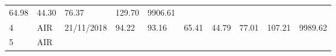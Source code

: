 \documentclass[
  11pt,
]{article}
\begin{document}
\begin{longtable}[]{@{}llllllllll@{}}
\begin{minipage}[t]{0.06\columnwidth}
64.98\strut
\end{minipage} & \begin{minipage}[t]{0.06\columnwidth}\raggedright
44.30\strut
\end{minipage} & \begin{minipage}[t]{0.06\columnwidth}\raggedright
76.37\strut
\end{minipage} & \begin{minipage}[t]{0.13\columnwidth}\raggedright
129.70\strut
\end{minipage} & \begin{minipage}[t]{0.08\columnwidth}\raggedright
9906.61\strut
\end{minipage}\tabularnewline
\begin{minipage}[t]{0.04\columnwidth}\raggedright
4\strut
\end{minipage} & \begin{minipage}[t]{0.09\columnwidth}\raggedright
AIR\strut
\end{minipage} & \begin{minipage}[t]{0.10\columnwidth}\raggedright
21/11/2018\strut
\end{minipage} & \begin{minipage}[t]{0.06\columnwidth}\raggedright
94.22\strut
\end{minipage} & \begin{minipage}[t]{0.06\columnwidth}\raggedright
93.16\strut
\end{minipage} & \begin{minipage}[t]{0.06\columnwidth}\raggedright
65.41\strut
\end{minipage} & \begin{minipage}[t]{0.06\columnwidth}\raggedright
44.79\strut
\end{minipage} & \begin{minipage}[t]{0.06\columnwidth}\raggedright
77.01\strut
\end{minipage} & \begin{minipage}[t]{0.13\columnwidth}\raggedright
107.21\strut
\end{minipage} & \begin{minipage}[t]{0.08\columnwidth}\raggedright
9989.62\strut
\end{minipage}\tabularnewline
\begin{minipage}[t]{0.04\columnwidth}\raggedright
5\strut
\end{minipage} & \begin{minipage}[t]{0.09\columnwidth}\raggedright
AIR\strut
\end{minipage} & \begin{minipage}[t]{0.10\columnwidth}\raggedright

\end{minipage}
\end{longtable}
\end{document}
